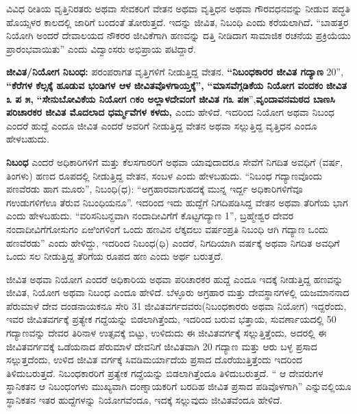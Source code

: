 ವಿವಿಧ ರೀತಿಯ ವೃತ್ತಿನಿರತರು ಅಥವಾ ಸೇವಕರಿಗೆ ವೇತನ ಅಥವಾ ವೃತ್ತಿಧನ ಅಥವಾ ಗೌರವಧನವನ್ನು ನೀಡುವ ಪದ್ಧತಿ ಹೊಯ್ಸಳರ ಕಾಲದಲ್ಲಿ ಜಾರಿಗೆ ಬಂದಂತೆ ತೋರುತ್ತದೆ. ಇದನ್ನು ಜೀವಿತ, ನಿಬಂಧಿ ಎಂದು ಕರೆಯಲಾಗಿದೆ\textbf{. }“ಬಾಹತ್ತರ ನಿಯೋಗಿ ಅಂದರೆ ದೇವಾಲಯದ ನೌಕರರ ಜೀವಿಕೆಗಾಗಿ ಹಣವನ್ನು ದತ್ತಿ ನೀಡಿದಾಗ ಸಾಮಾಜಿಕ ರಚನೆಯ ಪ್ರಕ್ರಿಯೆಯು ಪ್ರಾರಂಭವಾಯಿತು” ಎಂದು ವಿದ್ವಾಂಸರು ಅಭಿಪ್ರಾಯ ಪಟಿದ್ದಾರೆ.

\textbf{ಜೀವಿತ/ನಿಯೋಗ ನಿಬಂಧ:} ಪರಂಪರಾಗತ ವೃತ್ತಿಗಳಿಗೆ ನೀಡುತ್ತಿದ್ದ ವೇತನ. \textbf{“ನಿಬಂಧಕಾರರ ಜೀವಿತ ಗದ್ಯಾಣ} 20”,\textbf{ “ಕೆರೆಗಳ ಕೆಲ್ಸಕ್ಕೆ ಹೂಡುವ ಭಂಡಿಗಳ ಆಳ ಜೀವಿತವೊಳಗಾಯ್ತಕ್ಕೆ”,}\textbf{ “ಮಾಸವೆಗ್ಗಡಿಕೆಯ ನಿಯೋಗ ವಂದಕಂ} \textbf{ಜೀವಿತ ೩ ಪ ೫,}\textbf{ “ಸೇನುಬೋವಿಕೆಯ ನಿಯೋಗ ೧ಕಂ ಅಲ್ಲಾಳದೇವಂಗೆ ಜೀವಿತ ಗ೩ ಪ೫}”,\textbf{ವೃಂದಾವನಮಠದ ಬಾಣಸಿ ಪರಿಚಾರಕರ ಜೀವಿತ ಮೊದಲಾದ ಧರ್ಮ್ಮವೆಗಳ ಕಳದು,} ಎಂದು ಹೇಳಿದೆ. ಇದರಿಂದ ನಿಯೋಗ ಅಥವಾ ನಿಬಂಧ ಎಂದರೆ ಹುದ್ದೆ ಎಂದೂ ಜೀವಿತ ಎಂದರೆ ಅವರಿಗೆ ನೀಡುತ್ತಿದ್ದ ವೇತನ ಅಥವಾ ಸಲ್ಲುತ್ತಿದ್ದ ವೃತ್ತಿಧನ ಎಂದೂ ಹೇಳಬಹುದು.

\textbf{ನಿಬಂಧ} ಎಂದರೆ ಅಧಿಕಾರಿಗಳಿಗೆ ಮತ್ತು ಕೆಲಸಗಾರರಿಗೆ ಅಥವಾ ಯಾವುದಾದರೂ ಸೇವೆಗೆ ನಿಗದಿತ ಅವಧಿಗೆ (ವರ್ಷ, ತಿಂಗಳು) ಹಣದ ರೂಪದಲ್ಲಿ ನೀಡುತ್ತಿದ್ದ ವೇತನ, ಸಂಬಳ ಎಂದು ಹೇಳಬಹುದು. “ನಿಬಂಧ ಗದ್ಯಾಣವೊಂದು ಪಣವೆರಡು ಹಾಗ ಮೂರು”, ನಿಬಂಧಿ(ಧ): “ಅಗ್ರಹಾರವಾಗುಹದಕ್ಕೆ ಮುನ್ನ ಇರ್ದ್ದ ಅಧಿಕಾರಿಗಳಿಗೆವೂ ಗಉಡುಗಳಿಗೆಊ ತೆರುವ ನಿಬಂಧಿಯನೂ”. ಇದರಿಂದ ಇದು ಹುದ್ದೆಗೆ ನಿಗದಿಪಡಿಸಿದ್ದ ವೇತನ ಅಥವಾ ತೆರಿಗೆಯ ಭಾಗ ಎಂದು ಹೇಳಬಹುದು. “ವರಿಸನಿಬನ್ದವಾಗಿ ನಂದಾದೀವಿಗೆಗೆ ಕೊಟ್ಟಗದ್ಯಾಣ 1”, ಬ್ರಹ್ಮೇಶ್ವರ ದೇವರ ನಂದಾದೀವಿಗೆಗೋಸುಗಂ ಏಱಿಂಗಳಿಂಗೆ ಒಂದು ಹಣವಿನ ಲೆಕ್ಕದಲು ವರ್ಷಂಪ್ರತಿ ನಿಬಂಧಿ ಆಗಿ ಗದ್ಯಾಣ ಒಂದು ಹಣವೆರಡು” ಎಂದು ಹೇಳಿದ್ದು, ಇದರಿಂದ ನಿಬಂಧ(ಧಿ) ಎಂದರೆ, ನಿಗದಿಯಾಗಿ ವರ್ಷಕ್ಕೆ ಅಥವಾ ನಿಗದಿತ ಅವಧಿಗೆ ಒಂದು ಸಲ ನೀಡುತ್ತಿದ್ದ ತೆರಿಗೆಯ ರೂಪದ ಹಣ ಎಂದು ಅರ್ಥ ಬರುತ್ತದೆ.

ಜೀವಿತ ಅಥವಾ ನಿಯೋಗ ಎಂದರೆ ಅಧಿಕಾರಿಯ ಅಥವಾ ಪರಿಚಾರಕರ ಹುದ್ದೆ ಎಂದೂ ಇದಕ್ಕೆ ನೀಡುತ್ತಿದ್ದ ಹಣವನ್ನು ಜೀವಿತ, ನಿಯೋಗ ಅಥವಾ ನಿಬಂಧ ಎಂದೂ ಹೇಳಿದೆ. ಬೆಳ್ಳೂರು ಅಗ್ರಹಾರ ಮತ್ತು ದೇವಸ್ಥಾನಗಳಲ್ಲಿ ಯಜಮಾನನಾದ ಪೆರುಮಾಳೆ ದೇವ ದಂಡನಾಯಕನೂ ಸೇರಿ 31 ಜೀವಿತವರ್ಗದವರು(ನಿಬಂಧಕಾರರು ಅಥವಾ ನಿಯೋಗ) ಇದ್ದರೆಂದು, ಇವರ ಜೀವಿತವರ್ಗಕ್ಕೆ ಪ್ರತ್ಯೇಕ ಗದ್ದೆಯನ್ನು ಬಿಡಲಾಗಿತ್ತೆಂದು, ಇದರಿಂದ ಬರುವ ಭತ್ತಾಯ, ಸುವರ್ಣಾಯದಲ್ಲಿ 50 ಗದ್ಯಾಣವನ್ನು ದೇವರ ತಿರಿನಾಳ ಉತ್ಸವಕ್ಕೆ ಬಿಟ್ಟು, ಉಳಿದುದು ಈ ಜೀವಿತವರ್ಗಕ್ಕೆ ಸಲ್ಲುತ್ತಿತ್ತೆಂದು, ಅದರಲ್ಲಿ ಈ ಜೀವಿತವರ್ಗವಕ್ಕೆ ಒಡೆಯನಾದ ಪೆರುಮಾಳೆ ದೇವನಿಗೆ ಜೀವಿತವಾಗಿ 20 ಗದ್ಯಾಣ ಮತ್ತು ಆರು ಬಳ್ಳ ಪ್ರಸಾದ ಸಲ್ಲುತ್ತದೆಂದು, ಉಳಿದ ಜೀವಿತ ವರ್ಗಕ್ಕೆ ಸಿವಡಿಮರ್ಯಾದೆಯ ಪ್ರಸಾದ ದೊರೆಯುತ್ತಿತ್ತೆಂದು ಇದರಿಂದ ತಿಳಿದುಬರುತ್ತದೆ. ನಿಬಂಧಕಾರರಿಗೆ ಪ್ರತ್ಯೇಕ ಗದ್ದೆಯನ್ನು ಬಿಡಲಾಗಿತ್ತೆಂದೂ ತಿಳಿದುಬರುತ್ತದೆ. “ ಆ ದೇವರುಗಳ ಸ್ಥಾನಿಕತನ ಆ ನಿಬಂಧಂಗಳು ಮುಖ್ಯವಾಗಿ ದಂಣ್ನಾಯಕರಿಗೆ ಬರದಿಹ ಜೀವಿತ ಪ್ರಸಾದ ಪಡಿವೊಳಗಾಗಿ” ಎನ್ನುವಲ್ಲಿಯೂ ಸ್ಥಾನಿಕತನ ಇತರ ಹುದ್ದೆಗಳನ್ನು ನಿಯೋಗವೆಂದೂ, ಇದಕ್ಕೆ ಸಲ್ಲುವುದು ಜೀವಿತವೆಂದೂ ಹೇಳಿದೆ.

